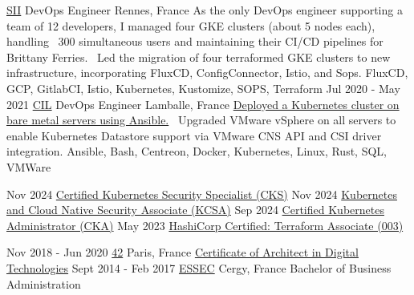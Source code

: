 \documentclass[10pt]{developercv}
\begin{document}
\begin{entrylist}
		{\href{https://sii-group.com/}{SII}}
		{DevOps Engineer}
		{Rennes, France}
		{As the only DevOps engineer supporting a team of 12 developers, I managed four GKE clusters (about 5 nodes each), handling ~300 simultaneous users and maintaining their CI/CD pipelines for Brittany Ferries. \ 
		Led the migration of four terraformed GKE clusters to new infrastructure, incorporating FluxCD, ConfigConnector, Istio, and Sops.
		}
		{FluxCD, GCP, GitlabCI, Istio, Kubernetes, Kustomize, SOPS, Terraform}
	\entry
		{Jul 2020 - May 2021}
		{\href{https://www.cil-lamballe.com/}{CIL}}
		{DevOps Engineer}
		{Lamballe, France}
		{\href{https://github.com/Ant0wan/VMWare-Kubenetes-cluster}{Deployed a Kubernetes cluster on bare metal servers using Ansible.} \ 
		Upgraded VMware vSphere on all servers to enable Kubernetes Datastore support via VMware CNS API and CSI driver integration.
		}
		{Ansible, Bash, Centreon, Docker, Kubernetes, Linux, Rust, SQL, VMWare}
\end{entrylist}


\begin{entrylist}
	\certentry
		{Nov 2024}
		{\href{}
		{Certified Kubernetes Security Specialist (CKS)}}
	\certentry
		{Nov 2024}
		{\href{https://ti-user-certificates.s3.amazonaws.com/e0df7fbf-a057-42af-8a1f-590912be5460/e8d771bd-68bf-4ac7-8077-2e885178505a-antoine-barthelemy-0dc67065-e867-412f-9d0e-1c246b44b258-certificate.pdf}
		{Kubernetes and Cloud Native Security Associate (KCSA)}}
	\certentry
		{Sep 2024}
		{\href{https://ti-user-certificates.s3.amazonaws.com/e0df7fbf-a057-42af-8a1f-590912be5460/e8d771bd-68bf-4ac7-8077-2e885178505a-antoine-barthelemy-21f9eeb4-ead2-4311-ba93-15865ca88f93-certificate.pdf}
		{Certified Kubernetes Administrator (CKA)}}
	\certentry
		{May 2023}
		{\href{https://www.credly.com/badges/7b8f2540-6b35-43a7-84d6-24dceb4001ee/public_url}
		{HashiCorp Certified: Terraform Associate (003)}}

\end{entrylist}


\begin{entrylist}
	\eduentry
		{Nov 2018 - Jun 2020}
		{\href{https://42.fr/}{42}}
		{Paris, France}
		{\href{https://acclaim-production-app.files.credly.com/uploads/printable_pdf/printable_pdf/c858004e-df38-4309-b3c4-e814299c3c6e/42-Certificatepdf20241002-7-ngaeg7.pdf?response-content-disposition=attachment&X-Amz-Expires=604800&X-Amz-Date=20241002T173738Z&X-Amz-Algorithm=AWS4-HMAC-SHA256&X-Amz-Credential=AKIA5DGBWDLSBJ5BZX5Z\%2F20241002\%2Fus-east-1\%2Fs3\%2Faws4_request&X-Amz-SignedHeaders=host&X-Amz-Signature=a55bc0206580e9d1da963475100f2dcea13c7d6e9b855c452bca2ac1ecec216c}
		{Certificate of Architect in Digital Technologies}}
	\eduentry
		{Sept 2014 - Feb 2017}
		{\href{https://www.essec.edu}{ESSEC}}
		{Cergy, France}
		{Bachelor of Business Administration}
\end{entrylist}
\end{document}
